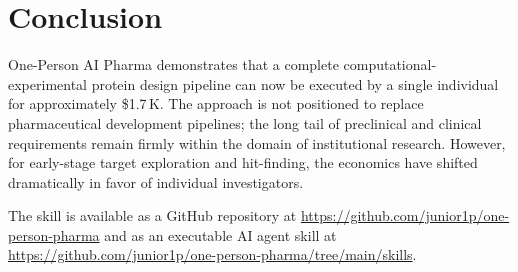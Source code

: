 \documentclass[12pt,a4paper]{article}
\begin{document}
\section{Conclusion}

One-Person AI Pharma demonstrates that a complete computational-experimental
protein design pipeline can now be executed by a single individual for
approximately \$1.7\,K. The approach is not positioned to replace
pharmaceutical development pipelines; the long tail of preclinical and clinical
requirements remain firmly within the domain of institutional research. However,
for early-stage target exploration and hit-finding, the economics have shifted
dramatically in favor of individual investigators.

The skill is available as a GitHub repository at
\url{https://github.com/junior1p/one-person-pharma} and as an executable AI
agent skill at \url{https://github.com/junior1p/one-person-pharma/tree/main/skills}.


\end{document}
